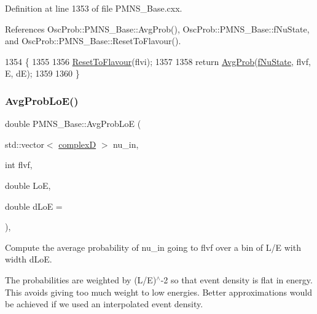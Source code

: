 Definition at line 1353 of file P\+M\+N\+S\+\_\+\+Base.\+cxx.



References Osc\+Prob\+::\+P\+M\+N\+S\+\_\+\+Base\+::\+Avg\+Prob(), Osc\+Prob\+::\+P\+M\+N\+S\+\_\+\+Base\+::f\+Nu\+State, and Osc\+Prob\+::\+P\+M\+N\+S\+\_\+\+Base\+::\+Reset\+To\+Flavour().


\begin{DoxyCode}
1354 \{
1355 
1356   \hyperlink{classOscProb_1_1PMNS__Base_ac0d4bf8ff1318ef96d3dafa62e0cec25}{ResetToFlavour}(flvi);
1357 
1358   \textcolor{keywordflow}{return} \hyperlink{classOscProb_1_1PMNS__Base_a89e54c80ae8a31effbab7b2b970606bb}{AvgProb}(\hyperlink{classOscProb_1_1PMNS__Base_abf99f2339e3ee989600740b5d88063e8}{fNuState}, flvf, E, dE);
1359 
1360 \}
\end{DoxyCode}
\mbox{\label{classOscProb_1_1PMNS__Base_a19f160c045a01e5083506e925fb37d44}} 
\subsubsection{\texorpdfstring{Avg\+Prob\+Lo\+E()}{AvgProbLoE()}\hspace{0.1cm}{\footnotesize\ttfamily [1/2]}}
{\footnotesize\ttfamily double P\+M\+N\+S\+\_\+\+Base\+::\+Avg\+Prob\+LoE (\begin{DoxyParamCaption}\item[{std\+::vector$<$ \hyperlink{EigenPoint_8h_a67ca8e107e20610c3fff78d5e726ece0}{complexD} $>$}]{nu\+\_\+in,  }\item[{int}]{flvf,  }\item[{double}]{LoE,  }\item[{double}]{d\+LoE = {} }\end{DoxyParamCaption})\hspace{0.3cm}{\ttfamily [virtual]}, {\ttfamily [inherited]}}

Compute the average probability of nu\+\_\+in going to flvf over a bin of L/E with width d\+LoE.

The probabilities are weighted by (L/E)$^\wedge$-\/2 so that event density is flat in energy. This avoids giving too much weight to low energies. Better approximations would be achieved if we used an interpolated event density.

